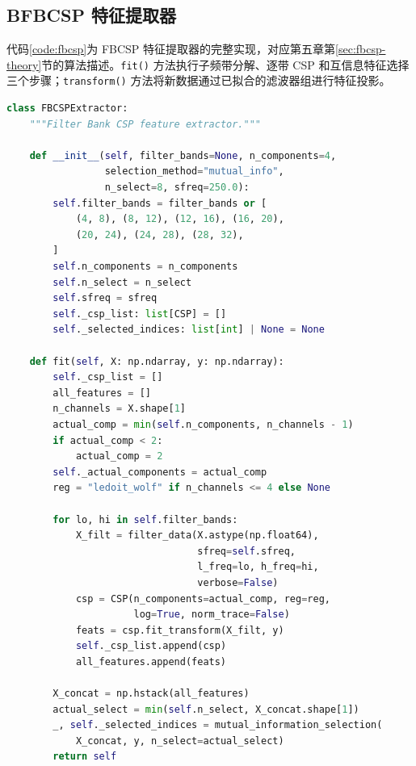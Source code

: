 \subsection*{B\quad FBCSP 特征提取器}

代码\ref{code:fbcsp}为 FBCSP 特征提取器的完整实现，对应第五章第\ref{sec:fbcsp-theory}节的算法描述。\texttt{fit()} 方法执行子频带分解、逐带 CSP 和互信息特征选择三个步骤；\texttt{transform()} 方法将新数据通过已拟合的滤波器组进行特征投影。

\begin{lstlisting}[language=Python, caption={FBCSP 特征提取器 \texttt{src/features/fbcsp.py}\label{code:fbcsp}}]
class FBCSPExtractor:
    """Filter Bank CSP feature extractor."""

    def __init__(self, filter_bands=None, n_components=4,
                 selection_method="mutual_info",
                 n_select=8, sfreq=250.0):
        self.filter_bands = filter_bands or [
            (4, 8), (8, 12), (12, 16), (16, 20),
            (20, 24), (24, 28), (28, 32),
        ]
        self.n_components = n_components
        self.n_select = n_select
        self.sfreq = sfreq
        self._csp_list: list[CSP] = []
        self._selected_indices: list[int] | None = None

    def fit(self, X: np.ndarray, y: np.ndarray):
        self._csp_list = []
        all_features = []
        n_channels = X.shape[1]
        actual_comp = min(self.n_components, n_channels - 1)
        if actual_comp < 2:
            actual_comp = 2
        self._actual_components = actual_comp
        reg = "ledoit_wolf" if n_channels <= 4 else None

        for lo, hi in self.filter_bands:
            X_filt = filter_data(X.astype(np.float64),
                                 sfreq=self.sfreq,
                                 l_freq=lo, h_freq=hi,
                                 verbose=False)
            csp = CSP(n_components=actual_comp, reg=reg,
                      log=True, norm_trace=False)
            feats = csp.fit_transform(X_filt, y)
            self._csp_list.append(csp)
            all_features.append(feats)

        X_concat = np.hstack(all_features)
        actual_select = min(self.n_select, X_concat.shape[1])
        _, self._selected_indices = mutual_information_selection(
            X_concat, y, n_select=actual_select)
        return self


\end{lstlisting}

